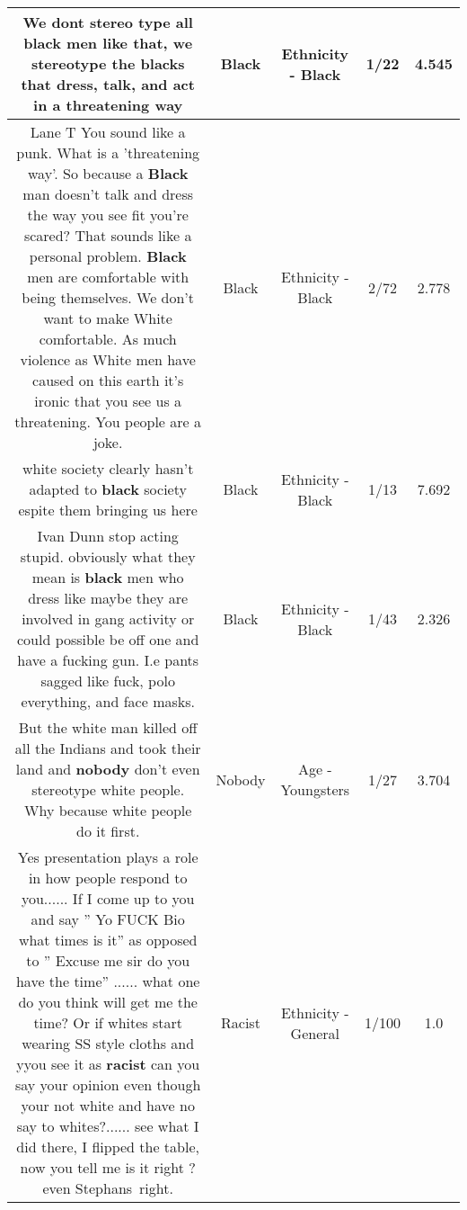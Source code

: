 \documentclass[11pt]{article}
\newlength\mylength
\begin{document}
\begin{center}
\begin{longtable}{|C{.65\mylength}|C{.30\mylength}|C{.12\mylength}|C{.12\mylength}|C{.12\mylength}|}
  \small We dont stereo type all \textbf{black} men like that, we stereotype the blacks that dress, talk, and act in a threatening way\normalsize   & Black & Ethnicity - Black & 1/22 & 4.545 \\  \hline
  \small Lane T You sound like a punk. What is a 'threatening way'. So because a \textbf{Black} man doesn't talk and dress the way you see fit you're scared? That sounds like a personal problem. \textbf{Black} men are comfortable with being themselves. We don't want to make White comfortable. As much violence as White men have caused on this earth it's ironic that you see us a threatening. You people are a joke.\normalsize   & Black & Ethnicity - Black & 2/72 & 2.778 \\  \hline
  \small white society clearly hasn't adapted to \textbf{black} society espite them bringing us here\normalsize   & Black & Ethnicity - Black & 1/13 & 7.692 \\  \hline
  \small Ivan Dunn stop acting stupid. obviously what they mean is \textbf{black} men who dress like maybe they are involved in gang activity or could possible be off one and have a fucking gun. I.e pants sagged like fuck, polo everything, and face masks.\normalsize   & Black & Ethnicity - Black & 1/43 & 2.326 \\  \hline
  \small But the white man killed off all the Indians and took their land and \textbf{nobody} don't even stereotype white people. Why because white people do it first.\normalsize   & Nobody & Age - Youngsters & 1/27 & 3.704 \\  \hline
  \small Yes presentation plays a role in how people respond to you...... If I come up to you and say '' Yo FUCK Bio what times is it'' as opposed to '' Excuse me sir do you have the time'' ...... what one do you think will get me the time? Or if whites start wearing SS style cloths and yyou see it as \textbf{racist} can you say your opinion even though your not white and have no say to whites?...... see what I did there, I flipped the table, now you tell me is it right ? even Stephans right.\normalsize   & Racist & Ethnicity - General & 1/100 & 1.0 \\  \hline

\end{longtable}
\end{center}
\end{document}

